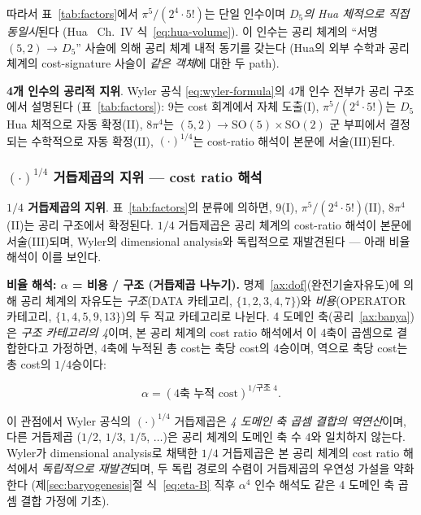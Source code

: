 \documentclass[entropy,article,submit,pdftex,oneauthor]{Definitions/mdpi}
\begin{document}
따라서 표~\ref{tab:factors}에서 $\pi^5/(2^4 \cdot 5!)$는 단일 인수이며 \emph{$D_5$의 Hua 체적으로 직접 동일시}된다 (Hua~\cite{hua1963} Ch.~IV 식~\eqref{eq:hua-volume}). 이 인수는 공리 체계의 ``서명 $(5,2)$ → $D_5$'' 사슬에 의해 공리 체계 내적 동기를 갖는다 (Hua의 외부 수학과 공리 체계의 cost-signature 사슬이 \emph{같은 객체}에 대한 두 path).

\textbf{4개 인수의 공리적 지위}. Wyler 공식 \eqref{eq:wyler-formula}의 4개 인수 전부가 공리 구조에서 설명된다 (표~\ref{tab:factors}): $9$는 cost 회계에서 자체 도출(I), $\pi^5/(2^4 \cdot 5!)$는 $D_5$ Hua 체적으로 자동 확정(II), $8\pi^4$는 $(5,2) \to \mathrm{SO}(5)\times\mathrm{SO}(2)$ 군 부피에서 결정되는 수학적으로 자동 확정(II), $(\cdot)^{1/4}$는 cost-ratio 해석이 본문에 서술(III)된다.

\subsubsection{$(\cdot)^{1/4}$ 거듭제곱의 지위 — cost ratio 해석}

\textbf{$1/4$ 거듭제곱의 지위}. 표~\ref{tab:factors}의 분류에 의하면, $9$(I), $\pi^5/(2^4 \cdot 5!)$(II), $8\pi^4$(II)는 공리 구조에서 확정된다. $1/4$ 거듭제곱은 공리 체계의 cost-ratio 해석이 본문에 서술(III)되며, Wyler의 dimensional analysis와 독립적으로 재발견된다 --- 아래 비율 해석이 이를 보인다.

\textbf{비율 해석: $\alpha$ = 비용 / 구조 (거듭제곱 나누기).} 명제~\ref{ax:dof}(완전기술자유도)에 의해 공리 체계의 자유도는 \emph{구조}(DATA 카테고리, $\{1, 2, 3, 4, 7\}$)와 \emph{비용}(OPERATOR 카테고리, $\{1, 4, 5, 9, 13\}$)의 두 직교 카테고리로 나뉜다. 4 도메인 축(공리~\ref{ax:banya})은 \emph{구조 카테고리의 4}이며, 본 공리 체계의 cost ratio 해석에서 이 4축이 곱셈으로 결합한다고 가정하면, 4축에 누적된 총 cost는 축당 cost의 4승이며, 역으로 축당 cost는 총 cost의 $1/4$승이다:
\begin{linenomath}
\begin{equation}
\alpha = (\text{4축 누적 cost})^{1/\text{구조 4}}.
\label{eq:cost-ratio}
\end{equation}
\end{linenomath}
이 관점에서 Wyler 공식의 $(\cdot)^{1/4}$ 거듭제곱은 \emph{4 도메인 축 곱셈 결합의 역연산}이며, 다른 거듭제곱 ($1/2$, $1/3$, $1/5$, $\ldots$)은 공리 체계의 도메인 축 수 $4$와 일치하지 않는다. Wyler가 dimensional analysis로 채택한 $1/4$ 거듭제곱은 본 공리 체계의 cost ratio 해석에서 \emph{독립적으로 재발견}되며, 두 독립 경로의 수렴이 거듭제곱의 우연성 가설을 약화한다 (제\ref{sec:baryogenesis}절 식~\eqref{eq:eta-B} 직후 $\alpha^4$ 인수 해석도 같은 4 도메인 축 곱셈 결합 가정에 기초).
\end{document}
